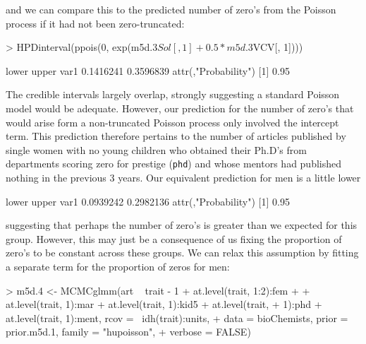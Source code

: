 \documentclass{article}
\begin{document}
and we can compare this to the predicted number of zero's from the Poisson process if it had not been zero-truncated:

\begin{Schunk}
\begin{Sinput}
> HPDinterval(ppois(0, exp(m5d.3$Sol[, 1] + 0.5 * m5d.3$VCV[, 1])))
\end{Sinput}
\begin{Soutput}
         lower     upper
var1 0.1416241 0.3596839
attr(,"Probability")
[1] 0.95
\end{Soutput}
\end{Schunk}

The credible intervals largely overlap, strongly suggesting a standard Poisson model would be adequate. However, our prediction for the number of zero's that would arise form a non-truncated Poisson process only involved the intercept term. This prediction therefore pertains to the number of articles published by single women with no young children who obtained their Ph.D's from departments scoring zero for prestige (\texttt{phd}) and whose mentors had published nothing in the previous 3 years.  Our equivalent prediction for men is a little lower 

\begin{Schunk}
\begin{Soutput}
         lower     upper
var1 0.0939242 0.2982136
attr(,"Probability")
[1] 0.95
\end{Soutput}
\end{Schunk}

suggesting that perhaps the number of zero's is greater than we expected for this group. However, this may just be a consequence of us fixing the proportion of zero's to be constant across these groups. We can relax this assumption by fitting a separate term for the proportion of zeros for men:

\begin{Schunk}
\begin{Sinput}
> m5d.4 <- MCMCglmm(art ~ trait - 1 + at.level(trait, 1:2):fem + 
+     at.level(trait, 1):mar + at.level(trait, 1):kid5 + at.level(trait, 
+     1):phd + at.level(trait, 1):ment, rcov = ~idh(trait):units, 
+     data = bioChemists, prior = prior.m5d.1, family = "hupoisson", 
+     verbose = FALSE)
\end{Sinput}
\end{Schunk}
\end{document}
